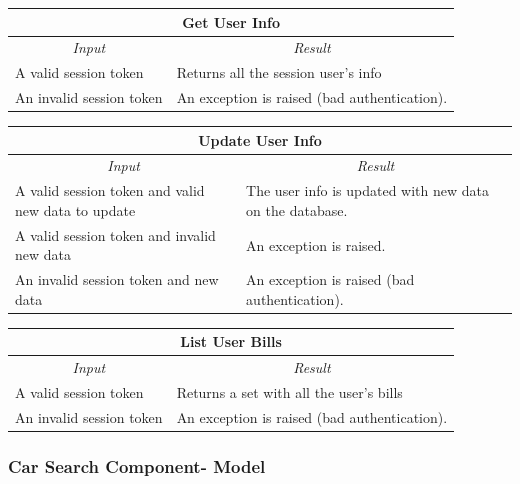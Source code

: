 \documentclass[english]{article}
\begin{document}
\begin{center}
	\begin{tabular}{ | p{6cm} | p{6cm} | }
		\hline 
		\multicolumn{2}{|c|}{\textbf{Get User Info}} \\
		\hline
		\multicolumn{1}{|c|}{\textit{Input}} & \multicolumn{1}{c|}{\textit{Result}} \\
		\hline
		A valid session token & Returns all the session user's info \\
		\hline
		An invalid session token & An exception is raised (bad authentication). \\
		\hline
	\end{tabular}
\end{center}

\begin{center}
	\begin{tabular}{ | p{6cm} | p{6cm} | }
		\hline 
		\multicolumn{2}{|c|}{\textbf{Update User Info}} \\
		\hline
		\multicolumn{1}{|c|}{\textit{Input}} & \multicolumn{1}{c|}{\textit{Result}} \\
		\hline
		A valid session token and valid new data to update & The user info is updated with new data on the database. \\
		\hline
		A valid session token and invalid new data & An exception is raised. \\
		\hline
		An invalid session token and new data & An exception is raised (bad authentication). \\
		\hline
	\end{tabular}
\end{center}

\begin{center}
	\begin{tabular}{ | p{6cm} | p{6cm} | }
		\hline 
		\multicolumn{2}{|c|}{\textbf{List User Bills}} \\
		\hline
		\multicolumn{1}{|c|}{\textit{Input}} & \multicolumn{1}{c|}{\textit{Result}} \\
		\hline
		A valid session token & Returns a set with all the user's bills \\
		\hline
		An invalid session token & An exception is raised (bad authentication). \\
		\hline
	\end{tabular}
\end{center}

\subsubsection{Car Search Component- Model}
\end{document}
